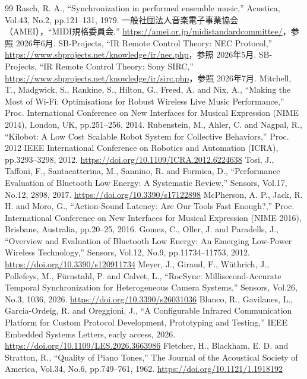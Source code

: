 \documentclass[uplatex,dvipdfmx]{jlreq}
\begin{document}
\begin{thebibliography}{99}
 Rasch, R. A., ``Synchronization in performed ensemble music,'' Acustica, Vol.43, No.2, pp.121--131, 1979.
 一般社団法人音楽電子事業協会（AMEI），``MIDI規格委員会,'' \url{https://amei.or.jp/midistandardcommittee/}，参照 2026年6月.
 SB-Projects, ``IR Remote Control Theory: NEC Protocol,'' \url{https://www.sbprojects.net/knowledge/ir/nec.php}，参照 2026年5月.
 SB-Projects, ``IR Remote Control Theory: Sony SIRC,'' \url{https://www.sbprojects.net/knowledge/ir/sirc.php}，参照 2026年7月.
 Mitchell, T., Madgwick, S., Rankine, S., Hilton, G., Freed, A. and Nix, A., ``Making the Most of Wi-Fi: Optimisations for Robust Wireless Live Music Performance,'' Proc. International Conference on New Interfaces for Musical Expression (NIME 2014), London, UK, pp.251--256, 2014.
 Rubenstein, M., Ahler, C. and Nagpal, R., ``Kilobot: A Low Cost Scalable Robot System for Collective Behaviors,'' Proc. 2012 IEEE International Conference on Robotics and Automation (ICRA), pp.3293--3298, 2012. \url{https://doi.org/10.1109/ICRA.2012.6224638}
 Tosi, J., Taffoni, F., Santacatterina, M., Sannino, R. and Formica, D., ``Performance Evaluation of Bluetooth Low Energy: A Systematic Review,'' Sensors, Vol.17, No.12, 2898, 2017. \url{https://doi.org/10.3390/s17122898}
 McPherson, A. P., Jack, R. H. and Moro, G., ``Action-Sound Latency: Are Our Tools Fast Enough?,'' Proc. International Conference on New Interfaces for Musical Expression (NIME 2016), Brisbane, Australia, pp.20--25, 2016.
 Gomez, C., Oller, J. and Paradells, J., ``Overview and Evaluation of Bluetooth Low Energy: An Emerging Low-Power Wireless Technology,'' Sensors, Vol.12, No.9, pp.11734--11753, 2012. \url{https://doi.org/10.3390/s120911734}
 Meyer, J., Giraud, F., W\"uthrich, J., Pollefeys, M., F\"urnstahl, P. and Calvet, L., ``RocSync: Millisecond-Accurate Temporal Synchronization for Heterogeneous Camera Systems,'' Sensors, Vol.26, No.3, 1036, 2026. \url{https://doi.org/10.3390/s26031036}
 Blanco, R., Gavilanes, L., Garcia-Ordeig, R. and Oreggioni, J., ``A Configurable Infrared Communication Platform for Custom Protocol Development, Prototyping and Testing,'' IEEE Embedded Systems Letters, early access, 2026. \url{https://doi.org/10.1109/LES.2026.3663986}
 Fletcher, H., Blackham, E. D. and Stratton, R., ``Quality of Piano Tones,'' The Journal of the Acoustical Society of America, Vol.34, No.6, pp.749--761, 1962. \url{https://doi.org/10.1121/1.1918192}

\end{thebibliography}
\end{document}
